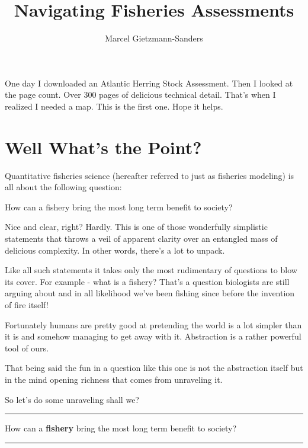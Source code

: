 \documentclass[11pt,a5paper]{book}
\title{Navigating Fisheries Assessments}
\author{Marcel Gietzmann-Sanders}
\date{}
\begin{document}
\maketitle
\newpage

One day I downloaded an Atlantic Herring Stock Assessment. Then I looked at the page count. Over 300 pages of delicious technical detail. That's when I realized I needed a map. This is the first one. Hope it helps.

\tableofcontents
\newpage

\chapter{Well What's the Point?}

Quantitative fisheries science (hereafter referred to just as fisheries modeling) is all about the following question:
\newline

 \hangindent=1cm \noindent How can a fishery bring the most long term benefit to society?
\newline

Nice and clear, right? Hardly. This is one of those wonderfully simplistic statements that throws a veil of apparent clarity over an entangled mass of delicious complexity. In other words, there's a lot to unpack.
\newline

Like all such statements it takes only the most rudimentary of questions to blow its cover. For example - what is a fishery? That's a question biologists are still arguing about and in all likelihood we've been fishing since before the invention of fire itself! 
\newline

Fortunately humans are pretty good at pretending the world is a lot simpler than it is and somehow managing to get away with it. Abstraction is a rather powerful tool of ours.
\newline

That being said the fun in a question like this one is not the abstraction itself but in the mind opening richness that comes from unraveling it.
\newline

So let's do some unraveling shall we? 
\newpage

\noindent \rule{\textwidth}{0.5pt} 
\noindent How can a \textbf{fishery} bring the most long term benefit to society?
\newline
\rule{\textwidth}{0.5pt} 
\vspace{5pt}
\end{document}
